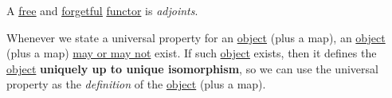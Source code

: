 \begin{definition}\label{def:adjoint-functor}
	A \hyperref[eg:free-functor]{\underline{free}} and \hyperref[eg:forgetful-functor]{\underline{forgetful}} \hyperref[def:functor]{functor} is \emph{adjoints}.
\end{definition}
\begin{remark}
	Whenever we state a universal property for an \hyperref[def:object]{object} (plus a map), an
	\hyperref[def:object]{object} (plus a map) \underline{may or may not} exist.
	If such \hyperref[def:object]{object} exists, then it defines the
	\hyperref[def:object]{object} \textbf{uniquely up to unique isomorphism}, so we can use the universal
	property as the \emph{definition} of the \hyperref[def:object]{object} (plus a map).
\end{remark}

